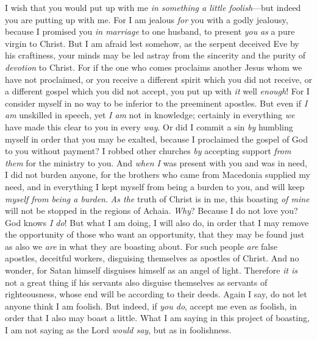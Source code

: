 \begin{biblechapter} %
 I wish that you would put up with me \textit{in something a little foolish}—but indeed you are putting up with me.
\verse For I am jealous \textit{for} you with a godly jealousy, because I promised you \textit{in marriage} to one husband, to present \textit{you} \textit{as} a pure virgin to Christ.
\verse But I am afraid lest somehow, as the serpent deceived Eve by his craftiness, your minds may be led astray from the sincerity and the purity of \textit{devotion} to Christ.
\verse For if the one who comes proclaims another Jesus whom we have not proclaimed, or you receive a different spirit which you did not receive, or a different gospel which you did not accept, you put up with \textit{it} well \textit{enough}!
\verse For I consider myself in no way to be inferior to the preeminent apostles.
\verse But even if \textit{I am} unskilled in speech, yet \textit{I am} not in knowledge; certainly in everything \textit{we} have made this clear to you in every \textit{way}.
\verse Or did I commit a sin \textit{by} humbling myself in order that you may be exalted, because I proclaimed the gospel of God to you without payment?
\verse I robbed other churches \textit{by} accepting support \textit{from them} for the ministry to you.
\verse And \textit{when I} was present with you and was in need, I did not burden anyone, for the brothers who came from Macedonia supplied my need, and in everything I kept myself from being a burden to you, and will keep \textit{myself from being a burden}.
\verse \textit{As the} truth of Christ is in me, this boasting \textit{of mine} will not be stopped in the regions of Achaia.
\verse \textit{Why}? Because I do not love you? God knows \textit{I do}!
\verse But what I am doing, I will also do, in order that I may remove the opportunity of those who want an opportunity, that they may be found just as also we \textit{are} in what they are boasting about.
\verse For such people \textit{are} false apostles, deceitful workers, disguising themselves as apostles of Christ.
\verse And no wonder, for Satan himself disguises himself as an angel of light.
\verse Therefore \textit{it is} not a great thing if his servants also disguise themselves as servants of righteousness, whose end will be according to their deeds.
 Again I say, do not let anyone think I am foolish. But indeed, if \textit{you do}, accept me even as foolish, in order that I also may boast a little.
\verse What I am saying in this project of boasting, I am not saying as the Lord \textit{would say}, but as in foolishness.

\end{biblechapter}

